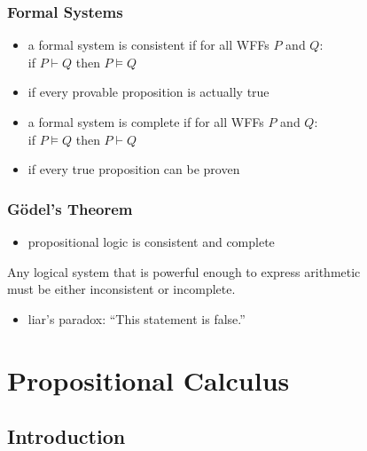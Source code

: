 \documentclass[dvipsnames]{beamer}
\begin{document}
\begin{frame}
  \frametitle{Formal Systems}

  \begin{itemize}
    \item a formal system is \alert{consistent} if for all WFFs $P$ and $Q$:\\
      if $P \vdash Q$ then $P \vDash Q$
    \item if every provable proposition is actually true

    \pause
    \bigskip
    \item a formal system is \alert{complete} if for all WFFs $P$ and $Q$:\\
        if $P \vDash Q$ then $P \vdash Q$
    \item if every true proposition can be proven
  \end{itemize}
\end{frame}

\begin{frame}
  \frametitle{Gödel's Theorem}

  \begin{itemize}
    \item propositional logic is consistent and complete
  \end{itemize}

  \pause
  \begin{theorem}
    Any logical system that is powerful enough to express arithmetic\\
    must be either inconsistent or incomplete.
  \end{theorem}

  \pause
  \medskip
  \begin{itemize}
    \item liar's paradox: ``This statement is false.''
  \end{itemize}
\end{frame}

\section{Propositional Calculus}

\subsection{Introduction}
\end{document}
